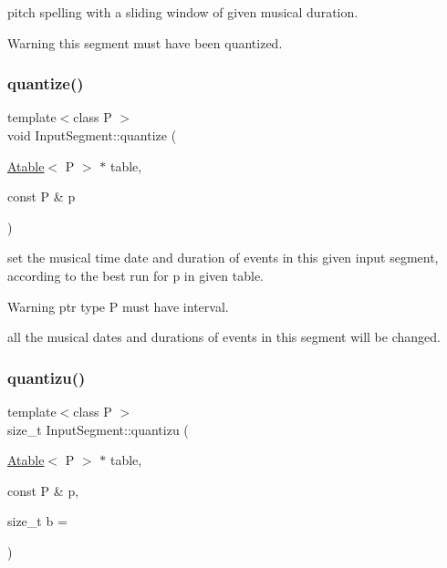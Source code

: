 pitch spelling with a sliding window of given musical duration. 

\begin{DoxyWarning}{Warning}
this segment must have been quantized. 
\end{DoxyWarning}
\mbox{\label{group__segment_ga42c65e4989c84fbce42115d8e7813f8e}} 
\subsubsection{\texorpdfstring{quantize()}{quantize()}}
{\footnotesize\ttfamily template$<$class P $>$ \\
void Input\+Segment\+::quantize (\begin{DoxyParamCaption}\item[{\mbox{\hyperlink{classAtable}{Atable}}$<$ P $>$ $\ast$}]{table,  }\item[{const P \&}]{p }\end{DoxyParamCaption})}



set the musical time date and duration of events in this given input segment, according to the best run for p in given table. 

\begin{DoxyWarning}{Warning}
ptr type P must have interval. 

all the musical dates and durations of events in this segment will be changed. 
\end{DoxyWarning}
\mbox{\label{group__segment_gab4c42d088ce3d170b7899712789ab464}} 
\subsubsection{\texorpdfstring{quantizu()}{quantizu()}}
{\footnotesize\ttfamily template$<$class P $>$ \\
size\+\_\+t Input\+Segment\+::quantizu (\begin{DoxyParamCaption}\item[{\mbox{\hyperlink{classAtable}{Atable}}$<$ P $>$ $\ast$}]{table,  }\item[{const P \&}]{p,  }\item[{size\+\_\+t}]{b = {} }\end{DoxyParamCaption})}



